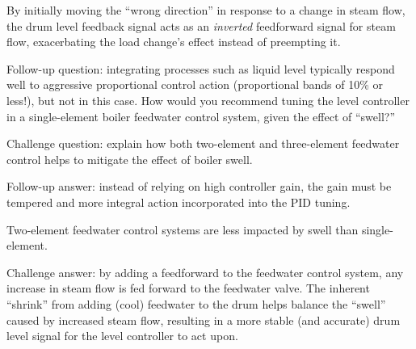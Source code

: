 
By initially moving the ``wrong direction'' in response to a change in steam flow, the drum level feedback signal acts as an {\it inverted} feedforward signal for steam flow, exacerbating the load change's effect instead of preempting it.

\vskip 10pt

Follow-up question: integrating processes such as liquid level typically respond well to aggressive proportional control action (proportional bands of 10\% or less!), but not in this case.  How would you recommend tuning the level controller in a single-element boiler feedwater control system, given the effect of ``swell?''

\vskip 10pt

Challenge question: explain how both two-element and three-element feedwater control helps to mitigate the effect of boiler swell.







Follow-up answer: instead of relying on high controller gain, the gain must be tempered and more integral action incorporated into the PID tuning.

\vskip 10pt

Two-element feedwater control systems are less impacted by swell than single-element.

\vskip 10pt

Challenge answer: by adding a feedforward to the feedwater control system, any increase in steam flow is fed forward to the feedwater valve.  The inherent ``shrink'' from adding (cool) feedwater to the drum helps balance the ``swell'' caused by increased steam flow, resulting in a more stable (and accurate) drum level signal for the level controller to act upon.




